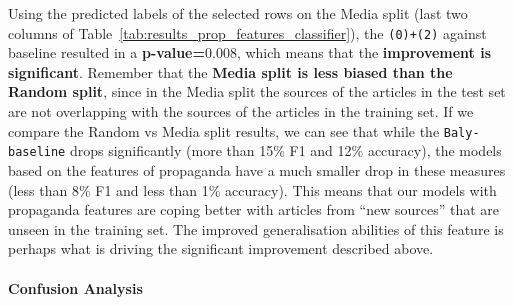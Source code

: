 
Using the predicted labels of the selected rows on the Media split (last two columns of Table~\ref{tab:results_prop_features_classifier}), the \texttt{(0)+(2)} against baseline resulted in a \textbf{p-value=$0.008$}, which means that the \textbf{improvement is significant}.
Remember that the \textbf{Media split is less biased than the Random split}, since in the Media split the sources of the articles in the test set are not overlapping with the sources of the articles in the training set. If we compare the Random vs Media split results, we can see that while the \texttt{Baly-baseline} drops significantly (more than 15\% F1 and 12\% accuracy), the models based on the features of propaganda have a much smaller drop in these measures (less than 8\% F1 and less than 1\% accuracy).
This means that our models with propaganda features are coping better with articles from ``new sources'' that are unseen in the training set. 
The improved generalisation abilities of this feature is perhaps what is driving the significant improvement described above. %

\paragraph{Confusion Analysis}

